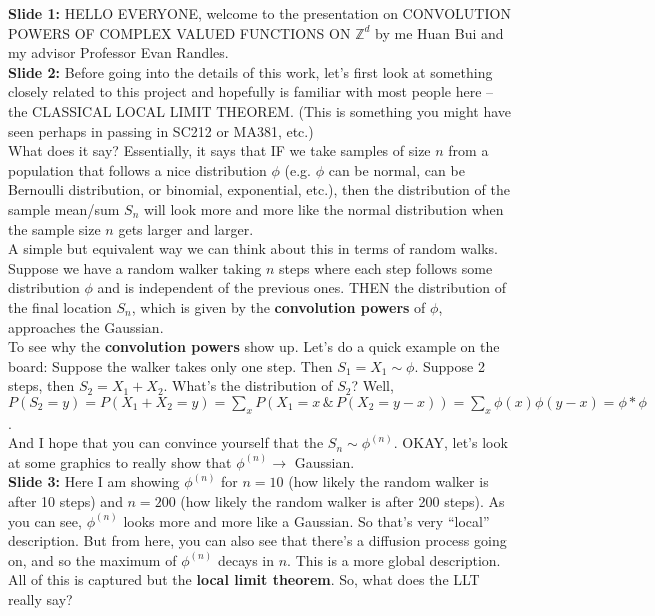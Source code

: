 \documentclass[11pt]{article}
\begin{document}
	
\noindent \textbf{Slide 1:}  HELLO EVERYONE, welcome to the presentation on CONVOLUTION POWERS OF COMPLEX VALUED FUNCTIONS ON $\mathbb{Z}^d$ by me Huan Bui and my advisor Professor Evan Randles.\\



\noindent \textbf{Slide 2:} Before going into the details of this work, let's first look at something closely related to this project and hopefully is familiar with most people here -- the CLASSICAL LOCAL LIMIT THEOREM. (This is something you might have seen perhaps in passing in SC212 or MA381, etc.)\\



What does it say? Essentially, it says that IF we take samples of size $n$ from a population that follows a nice distribution $\phi$ (e.g. $\phi$ can be normal, can be Bernoulli distribution, or binomial, exponential, etc.), then the distribution of the sample mean/sum $S_n$ will look more and more like the normal distribution when the sample size $n$ gets larger and larger. \\


A simple but equivalent way we can think about this in terms of random walks. Suppose we have a random walker taking $n$ steps where each step follows some distribution $\phi$ and is independent of the previous ones. THEN the distribution of the final location $S_n$, which is given by the \textbf{convolution powers} of $\phi$, approaches the Gaussian.  \\


To see why the \textbf{convolution powers} show up. Let's do a quick example on the board: Suppose the walker takes only one step. Then $S_1 = X_1 \sim \phi$. Suppose 2 steps, then $S_2 = X_1 + X_2$. What's the distribution of $S_2$? Well, $P(S_2= y) = P(X_1 + X_2 = y) = \sum_{x} P(X_1 = x \,\&\, P(X_2 = y-x) ) = \sum_{x}\phi(x)\phi(y-x) = \phi\ast \phi$. \\


And I hope that you can convince yourself that the $S_n \sim \phi^{(n)}$. OKAY, let's look at some graphics to really show that $\phi^{(n)} \to $ Gaussian. \\



\noindent \textbf{Slide 3:} Here I am showing $\phi^{(n)}$ for $n=10$ (how likely the random walker is after 10 steps) and $n=200$ (how likely the random walker is after 200 steps). As you can see, $\phi^{(n)}$ looks more and more like a Gaussian. So that's very ``local'' description. But from here, you can also see that there's a diffusion process going on, and so the maximum of $\phi^{(n)}$ decays in $n$. This is a more global description. All of this is captured but the \textbf{local limit theorem}. So, what does the LLT really say? \\
\end{document}
